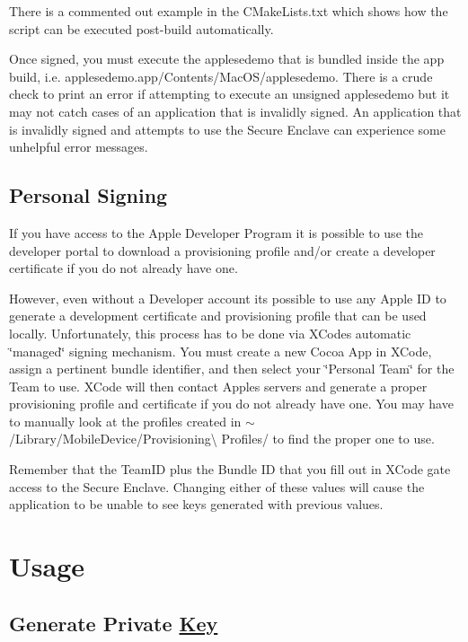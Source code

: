 There is a commented out example in the C\+Make\+Lists.\+txt which shows how the script can be executed post-\/build automatically.

Once signed, you must execute the {\ttfamily applesedemo} that is bundled inside the app build, i.\+e. {\ttfamily applesedemo.\+app/\+Contents/\+Mac\+O\+S/applesedemo}. There is a crude check to print an error if attempting to execute an unsigned {\ttfamily applesedemo} but it may not catch cases of an application that is invalidly signed. An application that is invalidly signed and attempts to use the Secure Enclave can experience some unhelpful error messages.

\subsection*{Personal Signing}

If you have access to the Apple Developer Program it is possible to use the developer portal to download a provisioning profile and/or create a developer certificate if you do not already have one.

However, even without a Developer account it\textquotesingle{}s possible to use any Apple ID to generate a development certificate and provisioning profile that can be used locally. Unfortunately, this process has to be done via X\+Code\textquotesingle{}s automatic \char`\"{}managed\char`\"{} signing mechanism. You must create a new Cocoa App in X\+Code, assign a pertinent bundle identifier, and then select your \char`\"{}\+Personal Team\char`\"{} for the Team to use. X\+Code will then contact Apple\textquotesingle{}s servers and generate a proper provisioning profile and certificate if you do not already have one. You may have to manually look at the profiles created in {\ttfamily $\sim$/\+Library/\+Mobile\+Device/\+Provisioning\textbackslash{} Profiles/} to find the proper one to use.

Remember that the Team\+ID plus the Bundle ID that you fill out in X\+Code gate access to the Secure Enclave. Changing either of these values will cause the application to be unable to see keys generated with previous values.

\section*{Usage}

\subsection*{Generate Private \mbox{\hyperlink{struct_key}{Key}}}

